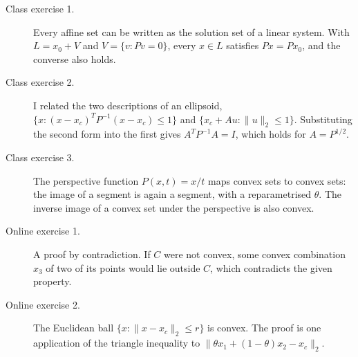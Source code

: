 



\begin{description}
  \item[Class exercise 1.] Every affine set can be written as the solution set of a linear system. With $L = x_0 + V$ and $V = \{v : Pv = 0\}$, every $x\in L$ satisfies $Px = Px_0$, and the converse also holds.
  \item[Class exercise 2.] I related the two descriptions of an ellipsoid, $\{x : (x-x_c)^T P^{-1}(x-x_c)\le 1\}$ and $\{x_c + Au : \|u\|_2\le 1\}$. Substituting the second form into the first gives $A^TP^{-1}A = I$, which holds for $A = P^{1/2}$.
  \item[Class exercise 3.] The perspective function $P(x,t)=x/t$ maps convex sets to convex sets: the image of a segment is again a segment, with a reparametrised $\theta$. The inverse image of a convex set under the perspective is also convex.
  \item[Online exercise 1.] A proof by contradiction. If $C$ were not convex, some convex combination $x_3$ of two of its points would lie outside $C$, which contradicts the given property.
  \item[Online exercise 2.] The Euclidean ball $\{x : \|x - x_c\|_2 \le r\}$ is convex. The proof is one application of the triangle inequality to $\|\theta x_1 + (1-\theta)x_2 - x_c\|_2$.
\end{description}

